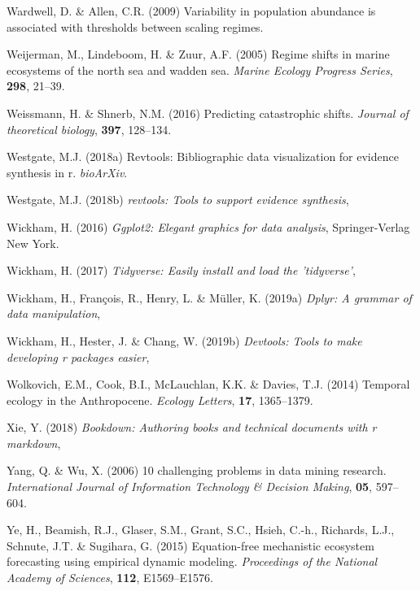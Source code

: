 \documentclass[12pt,twoside,openany]{reedthesis}
\begin{document}
\leavevmode\hypertarget{ref-wardwell2009variability}{}%
Wardwell, D. \& Allen, C.R. (2009) Variability in population abundance is associated with thresholds between scaling regimes.

\leavevmode\hypertarget{ref-weijerman2005regime}{}%
Weijerman, M., Lindeboom, H. \& Zuur, A.F. (2005) Regime shifts in marine ecosystems of the north sea and wadden sea. \emph{Marine Ecology Progress Series}, \textbf{298}, 21--39.

\leavevmode\hypertarget{ref-weissmann2016predicting}{}%
Weissmann, H. \& Shnerb, N.M. (2016) Predicting catastrophic shifts. \emph{Journal of theoretical biology}, \textbf{397}, 128--134.

\leavevmode\hypertarget{ref-revtools2}{}%
Westgate, M.J. (2018a) Revtools: Bibliographic data visualization for evidence synthesis in r. \emph{bioArXiv}.

\leavevmode\hypertarget{ref-revtools}{}%
Westgate, M.J. (2018b) \emph{revtools: Tools to support evidence synthesis},

\leavevmode\hypertarget{ref-ggplot2}{}%
Wickham, H. (2016) \emph{Ggplot2: Elegant graphics for data analysis}, Springer-Verlag New York.

\leavevmode\hypertarget{ref-tidyverse}{}%
Wickham, H. (2017) \emph{Tidyverse: Easily install and load the 'tidyverse'},

\leavevmode\hypertarget{ref-dplyr}{}%
Wickham, H., François, R., Henry, L. \& Müller, K. (2019a) \emph{Dplyr: A grammar of data manipulation},

\leavevmode\hypertarget{ref-devtools}{}%
Wickham, H., Hester, J. \& Chang, W. (2019b) \emph{Devtools: Tools to make developing r packages easier},

\leavevmode\hypertarget{ref-wolkovich_temporal_2014}{}%
Wolkovich, E.M., Cook, B.I., McLauchlan, K.K. \& Davies, T.J. (2014) Temporal ecology in the Anthropocene. \emph{Ecology Letters}, \textbf{17}, 1365--1379.

\leavevmode\hypertarget{ref-bookdown}{}%
Xie, Y. (2018) \emph{Bookdown: Authoring books and technical documents with r markdown},

\leavevmode\hypertarget{ref-yang_10_2006}{}%
Yang, Q. \& Wu, X. (2006) 10 challenging problems in data mining research. \emph{International Journal of Information Technology \& Decision Making}, \textbf{05}, 597--604.

\leavevmode\hypertarget{ref-ye2015equation}{}%
Ye, H., Beamish, R.J., Glaser, S.M., Grant, S.C., Hsieh, C.-h., Richards, L.J., Schnute, J.T. \& Sugihara, G. (2015) Equation-free mechanistic ecosystem forecasting using empirical dynamic modeling. \emph{Proceedings of the National Academy of Sciences}, \textbf{112}, E1569--E1576.
\end{document}

